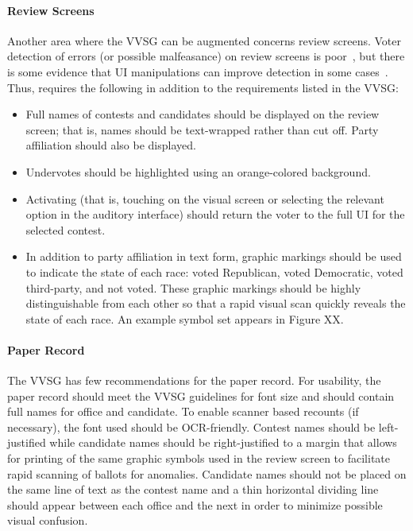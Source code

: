 \paragraph{Review Screens}
Another area where the VVSG can be augmented concerns review screens. Voter detection of errors (or possible malfeasance) on review screens is poor~\cite{everett07thesis}, but there is some evidence that UI manipulations can improve detection in some cases~\cite{campbell-evt09}. Thus, \projname  requires the following in addition to the requirements listed in the VVSG:
\begin{itemize}
\item  Full names of contests and candidates should be displayed on the review screen; that is, names should be text-wrapped rather than cut off. Party affiliation should also be displayed.
\item Undervotes should be highlighted using an orange-colored background. 
\item Activating (that is, touching on the visual screen or selecting the relevant option in the auditory interface) should return the voter to the full UI for the selected contest.
\item In addition to party affiliation in text form, graphic markings should be used to indicate the state of each race: voted Republican, voted Democratic, voted third-party, and not voted. These graphic markings should be highly distinguishable from each other so that a rapid visual scan quickly reveals the state of each race. An example symbol set appears in Figure XX.
\end{itemize}

\paragraph{Paper Record}
The VVSG has few recommendations for the paper record. For usability, the paper record should meet the VVSG guidelines for font size and should contain full names for office and candidate. To enable scanner based recounts (if necessary), the font used should be OCR-friendly. Contest names should be left-justified while candidate names should be right-justified to a margin that allows for printing of the same graphic symbols used in the review screen to facilitate rapid scanning of ballots for anomalies. Candidate names should not be placed on the same line of text as the contest name and a thin horizontal dividing line should appear between each office and the next in order to minimize possible visual confusion.

